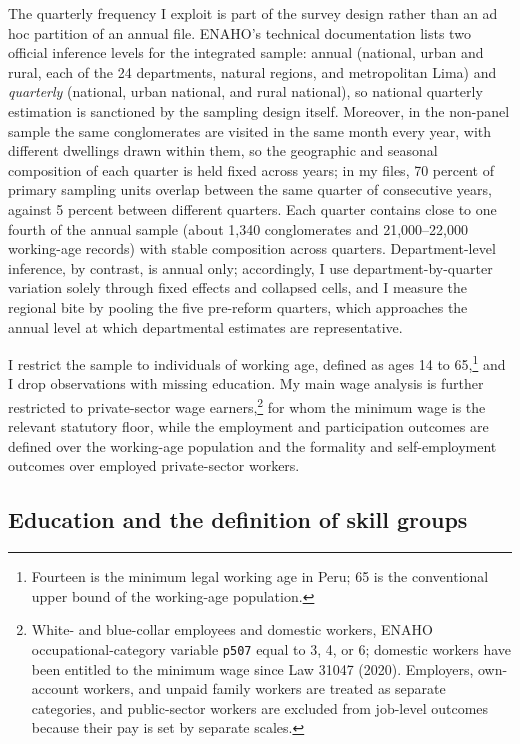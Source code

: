 The quarterly frequency I exploit is part of the survey design rather than an ad hoc partition of an annual file. ENAHO's technical documentation lists two official inference levels for the integrated sample: annual (national, urban and rural, each of the 24 departments, natural regions, and metropolitan Lima) and \emph{quarterly} (national, urban national, and rural national), so national quarterly estimation is sanctioned by the sampling design itself. Moreover, in the non-panel sample the same conglomerates are visited in the same month every year, with different dwellings drawn within them, so the geographic and seasonal composition of each quarter is held fixed across years; in my files, 70 percent of primary sampling units overlap between the same quarter of consecutive years, against 5 percent between different quarters. Each quarter contains close to one fourth of the annual sample (about 1{,}340 conglomerates and 21{,}000--22{,}000 working-age records) with stable composition across quarters. Department-level inference, by contrast, is annual only; accordingly, I use department-by-quarter variation solely through fixed effects and collapsed cells, and I measure the regional bite by pooling the five pre-reform quarters, which approaches the annual level at which departmental estimates are representative.

I restrict the sample to individuals of working age, defined as ages 14 to 65,\footnote{Fourteen is the minimum legal working age in Peru; 65 is the conventional upper bound of the working-age population.} and I drop observations with missing education. My main wage analysis is further restricted to private-sector wage earners,\footnote{White- and blue-collar employees and domestic workers, ENAHO occupational-category variable \texttt{p507} equal to 3, 4, or 6; domestic workers have been entitled to the minimum wage since Law 31047 (2020). Employers, own-account workers, and unpaid family workers are treated as separate categories, and public-sector workers are excluded from job-level outcomes because their pay is set by separate scales.} for whom the minimum wage is the relevant statutory floor, while the employment and participation outcomes are defined over the working-age population and the formality and self-employment outcomes over employed private-sector workers.

\subsection{Education and the definition of skill groups}

